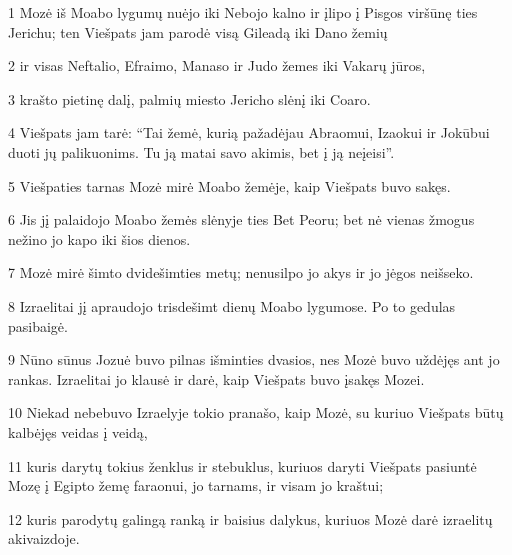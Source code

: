 \par 1 Mozė iš Moabo lygumų nuėjo iki Nebojo kalno ir įlipo į Pisgos viršūnę ties Jerichu; ten Viešpats jam parodė visą Gileadą iki Dano žemių 
\par 2 ir visas Neftalio, Efraimo, Manaso ir Judo žemes iki Vakarų jūros, 
\par 3 krašto pietinę dalį, palmių miesto Jericho slėnį iki Coaro. 
\par 4 Viešpats jam tarė: “Tai žemė, kurią pažadėjau Abraomui, Izaokui ir Jokūbui duoti jų palikuonims. Tu ją matai savo akimis, bet į ją neįeisi”. 
\par 5 Viešpaties tarnas Mozė mirė Moabo žemėje, kaip Viešpats buvo sakęs. 
\par 6 Jis jį palaidojo Moabo žemės slėnyje ties Bet Peoru; bet nė vienas žmogus nežino jo kapo iki šios dienos. 
\par 7 Mozė mirė šimto dvidešimties metų; nenusilpo jo akys ir jo jėgos neišseko. 
\par 8 Izraelitai jį apraudojo trisdešimt dienų Moabo lygumose. Po to gedulas pasibaigė. 
\par 9 Nūno sūnus Jozuė buvo pilnas išminties dvasios, nes Mozė buvo uždėjęs ant jo rankas. Izraelitai jo klausė ir darė, kaip Viešpats buvo įsakęs Mozei. 
\par 10 Niekad nebebuvo Izraelyje tokio pranašo, kaip Mozė, su kuriuo Viešpats būtų kalbėjęs veidas į veidą, 
\par 11 kuris darytų tokius ženklus ir stebuklus, kuriuos daryti Viešpats pasiuntė Mozę į Egipto žemę faraonui, jo tarnams, ir visam jo kraštui; 
\par 12 kuris parodytų galingą ranką ir baisius dalykus, kuriuos Mozė darė izraelitų akivaizdoje.



